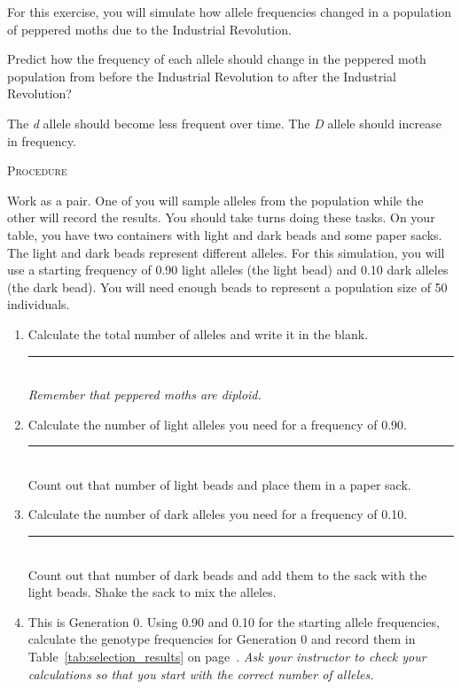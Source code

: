 \documentclass[12pt]{exam}
\newcommand*\AnswerBox[2]{%
    \parbox[t][#1]{0.92\textwidth}{%
    \begin{solution}#2\end{solution}}
    \vspace{\stretch{1}}
}
\newcommand{\allele}[1]{\textit{#1}}
\begin{document}
For this exercise, you will simulate how allele frequencies changed in a population of peppered moths due to the Industrial Revolution. 

\begin{questions}

\question\label{ques:selection_prediction}
Predict how the frequency of each allele should change in the peppered moth population from before the Industrial Revolution to after the Industrial Revolution?

\AnswerBox{2\baselineskip}{The \allele{d} allele should become less frequent over time. The \allele{D} allele should increase in frequency.}

\newpage

\textsc{Procedure}

\medskip

Work as a pair. One of you will sample alleles from the population while the other will record the results. You should take turns doing these tasks.  On your table, you have two containers with light and dark beads and some paper sacks. The light and dark beads represent different alleles. For this simulation, you will use a starting frequency of 0.90 light alleles (the light bead) and 0.10 dark alleles (the dark bead). You will need enough beads to represent a population size of 50 individuals.

\begin{enumerate}

	\item Calculate the total number of alleles and write it in the blank. \hfill \rule{0.5in}{0.4pt}\\ \emph{Remember that peppered moths are diploid.} 
	
	\item Calculate the number of light alleles you need for a frequency of 0.90. \hfill \rule{0.5in}{0.4pt} \\ Count out that number of light beads and place them in a paper sack. 
	
	\item Calculate the number of dark alleles you need for a frequency of 0.10. \hfill \rule{0.5in}{0.4pt} \\ Count out that number of dark beads and add them to the sack with the light beads. Shake the sack to mix the alleles.
	
	\item This is Generation 0. Using 0.90 and 0.10 for the starting allele frequencies, calculate the genotype frequencies for Generation 0 and record them in Table~\ref{tab:selection_results} on page~\pageref{tab:selection_results}. \emph{Ask your instructor to check your calculations so that you start with the correct number of alleles.}
	

\end{enumerate}
\end{questions}
\end{document}
